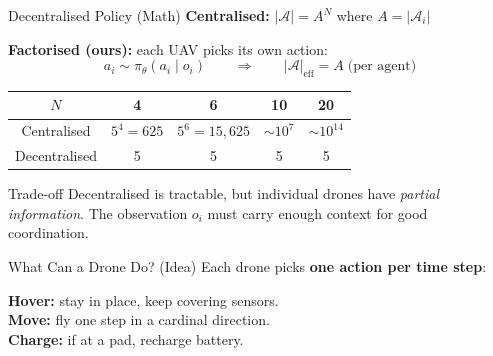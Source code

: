 \documentclass[aspectratio=169,12pt]{beamer}
\begin{document}
\begin{frame}{Decentralised Policy (Math)}
\textbf{Centralised:}
$|\mathcal{A}| = A^N$ where $A = |\mathcal{A}_i|$

\vspace{0.3em}

\textbf{Factorised (ours):} each UAV picks its own action:
\[
a_i \sim \pi_\theta(a_i \mid o_i)
\qquad \Longrightarrow \qquad
|\mathcal{A}|_{\text{eff}} = A \;\text{(per agent)}
\]

\vspace{0.5em}
\begin{center}
\begin{tabular}{@{}ccccc@{}}
\toprule
$N$ & 4 & 6 & 10 & 20 \\
\midrule
Centralised & $5^4{=}625$ & $5^6{=}15{,}625$ & $\sim10^7$ & $\sim10^{14}$ \\
Decentralised & 5 & 5 & 5 & 5 \\
\bottomrule
\end{tabular}
\end{center}

\vspace{0.4em}
\begin{block}{Trade-off}
Decentralised is tractable, but individual drones have \emph{partial information}.
The observation $o_i$ must carry enough context for good coordination.
\end{block}
\end{frame}


\begin{frame}{What Can a Drone Do? (Idea)}
Each drone picks \textbf{one action per time step}:

\begin{center}
\end{center}

\vspace{0.4em}
\textbf{Hover:} stay in place, keep covering sensors.\\
\textbf{Move:} fly one step in a cardinal direction.\\
\textbf{Charge:} if at a pad, recharge battery.
\end{frame}
\end{document}
